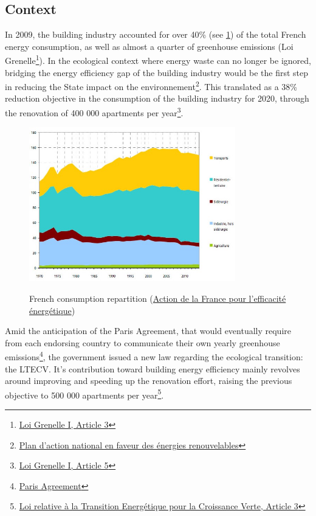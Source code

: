 \documentclass[12pt]{article}
\begin{document}
\subsection{Context}
In 2009, the building industry accounted for over 40\% (see \ref{consumption_repartition}) of the total French energy consumption, as well as almost a quarter of greenhouse emissions (Loi Grenelle\footnote{\href{https://www.legifrance.gouv.fr/loda/id/JORFTEXT000020949548/2020-09-21/}{Loi Grenelle I, Article 3}}). In the ecological context where energy waste can no longer be ignored, bridging the energy efficiency gap of the building industry would be the first step in reducing the State impact on the environnement\footnote{\href{http://temis.documentation.developpement-durable.gouv.fr/docs/Temis/0067/Temis-0067836/18854.pdf}{Plan d'action national en faveur des énergies renouvelables}}. This translated as a 38\% reduction objective in the consumption of the building industry for 2020, through the renovation of 400 000 apartments per year\footnote{\href{https://www.legifrance.gouv.fr/loda/id/JORFTEXT000020949548/2020-09-21/}{Loi Grenelle I, Article 5}}.

\begin{figure}
    \caption{French consumption repartition (\href{https://www.ecologie.gouv.fr/action-france-lefficacite-energetique}{Action de la France pour l’efficacité énergétique})}
    \centering
    \includegraphics[width=0.8\textwidth]{consumption_evolution_1970_2015.jpg}
    \label{consumption_repartition}
\end{figure}

Amid the anticipation of the Paris Agreement, that would eventually require from each endorsing country to communicate their own yearly greenhouse emissions\footnote{\href{https://unfccc.int/files/meetings/paris_nov_2015/application/pdf/paris_agreement_english_.pdf}{Paris Agreement}}, the government issued a new law regarding the ecological transition: the LTECV. It's contribution toward building energy efficiency mainly revolves around improving and speeding up the renovation effort, raising the previous objective to 500 000 apartments per year\footnote{\href{https://www.legifrance.gouv.fr/jorf/id/JORFTEXT000031044385/}{Loi relative à la Transition Energétique pour la Croissance Verte, Article 3}}.
\end{document}
